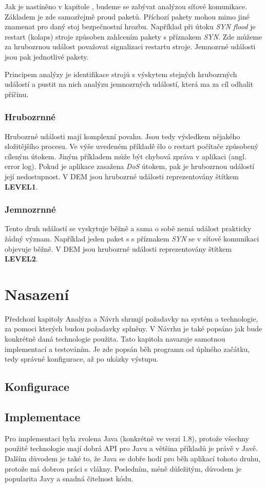 \documentclass[
  digital, %
  table,   %
  nolof,     %
  nolot,     %
  twoside, %
  nocover,
  monochrome,
  12pt
]{fithesis3}
\begin{document}
Jak je nastíněno v kapitole \label{sec:analysis}, budeme se zabývat analýzou síťové komunikace. Základem je zde samozřejmě proud paketů. Příchozí pakety mohou mimo jiné znamenat pro daný stoj bezpečnostní hrozbu. Například při útoku \textit{SYN flood} je restart (kolaps) stroje způsoben zahlcením pakety s příznakem \textit{SYN}. Zde můžeme za hrubozrnou událost považovat signalizaci restartu stroje. Jemnozrné události jsou pak jednotlivé pakety.

Principem analýzy je identifikace strojů s výskytem stejných hrubozrných událostí a pustit na nich analýzu jemnozrných událostí, která ma za cíl odhalit příčinu.
 
\subsection*{Hrubozrnné}
Hrubozrné události mají komplexní povahu. Jsou tedy výsledkem nějakého složitějšího procesu. Ve výše uvedeném příkladě šlo o restart počítače způsobený cíleným útokem. Jiným příkladem může být chybová zpráva v aplikaci (angl. error log). Pokud je aplikace zasažena \textit{DoS} útokem, pak je hrubozrnou událostí její nedostupnost. V DEM jsou hrubozrné události reprezentovány štítkem \textbf{LEVEL1}.
 
\subsection*{Jemnozrnné}
Tento druh událostí se vyskytuje běžně a sama o sobě nemá událost prakticky žádný význam. Například jeden paket s s příznakem \textit{SYN} se v síťové komunikaci objevuje běžně. V DEM jsou hrubozrné události reprezentovány štítkem \textbf{LEVEL2}.

\chapter{Nasazení}
Předchozí kapitoly Analýza a Návrh shrnují požadavky na systém a technologie, za pomoci kterých budou požadavky splněny. V Návrhu je také popsáno jak bude konkrétně daná technologie použita. Tato kapitola navazuje samotnou implementací a testováním. Je zde popsán běh programu od úplného začátku, tedy správné konfigurace, až po ukázky výstupu. 

\section{Konfigurace}
\section{Implementace}
Pro implementaci byla zvolena Java (konkrétně ve verzi 1.8), protože všechny použité technologie mají dobrá API pro Javu a většina příkladů je právě v Javě. Dalším důvodem je také to, že Java se dobře hodí pro běh aplikací tohoto druhu, protože má dobrou práci s vlákny. Posledním, méně důležitým, důvodem je popularita Javy a snadná čitelnost kódu.
\end{document}
